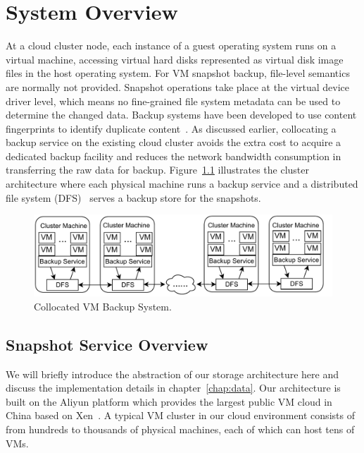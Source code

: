 \chapter{System Overview}
\label{chap:overview}
At a cloud cluster node, each instance of a guest operating system runs on a virtual machine, accessing virtual hard disks 
represented as virtual disk image files in the host operating system.
For VM snapshot backup, file-level semantics are normally not provided.
Snapshot operations take place at the virtual device driver level, which
means no fine-grained file system metadata can be used to determine the changed data. 
Backup systems have been developed to use content fingerprints to identify duplicate
content~\cite{venti02,Rhea2008}.  
As discussed earlier, collocating a backup service on the existing
cloud cluster avoids the extra cost to acquire a dedicated backup facility
and reduces the network bandwidth consumption in transferring the
raw data for backup. 
Figure~\ref{fig:collocated} illustrates the cluster architecture where
each physical machine runs a backup service and a distributed file system (DFS)~\cite{googlefs03,hdfs10} 
serves a backup store  for the snapshots.

\begin{figure}[htb]
    \centering
    \includegraphics[width=5in]{images/colocated-arch}
    \caption{Collocated VM Backup System.}
    \label{fig:collocated}
\end{figure}

\section{Snapshot Service Overview}
\label{overview:ss}
We will briefly introduce the abstraction of our storage architecture here 
and discuss the implementation details in chapter~\ref{chap:data}.
Our architecture is built on the Aliyun platform which provides the largest public VM cloud in China 
based on Xen~\cite{Xen2003}. A typical VM cluster in our cloud environment
consists of from hundreds to thousands of physical machines, each of which can
host tens of VMs.

